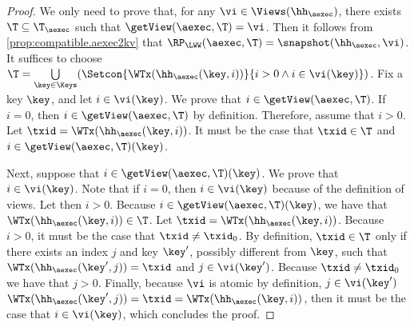 \begin{proof}
We only need to prove that, for any $\vi \in \Views(\hh_{\aexec})$, there exists $\T \subseteq \T_{\aexec}$ such 
that $\getView(\aexec, \T) = \vi$. Then it follows from \cref{prop:compatible.aexec2kv} that 
$\RP_{\LWW}(\aexec, \T) = \snapshot(\hh_{\aexec}, \vi)$. 
It suffices to choose $\T = \bigcup\limits_{\key \in \Keys}(\Setcon{ \WTx(\hh_{\aexec}(\key, i)) }{ i > 0 
\wedge i \in \vi(\key)})$.
Fix a key $\key$, and let $i \in \vi(\key)$. We prove that $i \in \getView(\aexec, \T)$. 
If $i = 0$, then $i \in \getView(\aexec, \T)$ by definition. 
Therefore, assume that $i > 0$. Let $\txid = \WTx(\hh_{\aexec}(\key, i))$.
It must be the case that $\txid \in \T$ and $i \in \getView(\aexec, \T)(\key)$.

Next, suppose that $i \in \getView(\aexec, \T)(\key)$. We prove that $i \in \vi(\key)$.
Note that if $i = 0$, then $i \in \vi(\key)$ because of the 
definition of views. Let then $i > 0$. Because $i \in \getView(\aexec, \T)(\key)$, we have that 
$\WTx(\hh_{\aexec}(\key, i)) \in \T$.  Let $\txid = \WTx(\hh_{\aexec}(\key, i))$. Because $i > 0$, 
it must be the case that $\txid \neq \txid_0$.
By definition, $\txid \in \T$ only if there 
exists an index $j$ and key $\key'$, possibly different from $\key$, such that $\WTx(\hh_{\aexec}(\key', j)) = \txid$ and $j \in \vi(\key')$. 
Because $\txid \neq \txid_0$ we have that $j > 0$. Finally, because $\vi$ is atomic by definition, $j \in \vi(\key')$
$\WTx(\hh_{\aexec}(\key', j)) = \txid = \WTx(\hh_{\aexec}(\key, i))$, then it must be the case 
that $i \in \vi(\key)$, which concludes the proof.
\end{proof}

